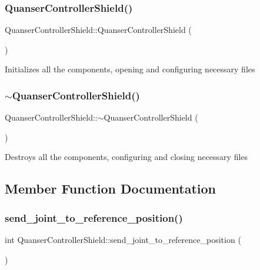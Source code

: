 \subsubsection{\texorpdfstring{Quanser\+Controller\+Shield()}{QuanserControllerShield()}}
{\footnotesize\ttfamily Quanser\+Controller\+Shield\+::\+Quanser\+Controller\+Shield (\begin{DoxyParamCaption}{ }\end{DoxyParamCaption})}

Initializes all the components, opening and configuring necessary files \mbox{\label{classQuanserControllerShield_a60b539f19bf54838086557c8c3e7a1bb}} 
\subsubsection{\texorpdfstring{$\sim$\+Quanser\+Controller\+Shield()}{~QuanserControllerShield()}}
{\footnotesize\ttfamily Quanser\+Controller\+Shield\+::$\sim$\+Quanser\+Controller\+Shield (\begin{DoxyParamCaption}{ }\end{DoxyParamCaption})\hspace{0.3cm}{\ttfamily [virtual]}}

Destroys all the components, configuring and closing necessary files 

\subsection{Member Function Documentation}
\mbox{\label{classQuanserControllerShield_acc48f947e7646699383b8ff786a71f22}} 
\subsubsection{\texorpdfstring{send\+\_\+joint\+\_\+to\+\_\+reference\+\_\+position()}{send\_joint\_to\_reference\_position()}}
{\footnotesize\ttfamily int Quanser\+Controller\+Shield\+::send\+\_\+joint\+\_\+to\+\_\+reference\+\_\+position (\begin{DoxyParamCaption}{ }\end{DoxyParamCaption})}

